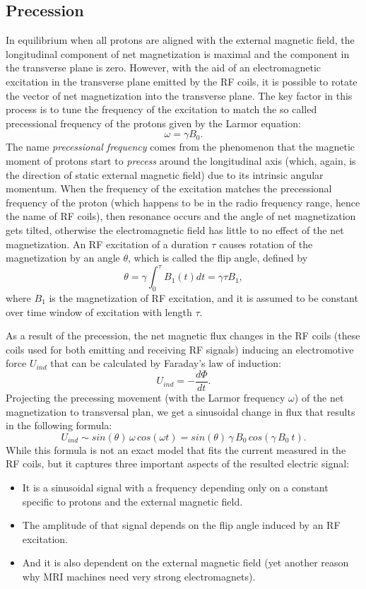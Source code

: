 \subsection{Precession}
In equilibrium when all protons are aligned with the external magnetic field, the longitudinal component of net magnetization is maximal and the component in the transverse plane is zero. However, with the aid of an electromagnetic excitation in the transverse plane emitted by the RF coils, it is possible to rotate the vector of net magnetization into the transverse plane. The key factor in this process is to tune the frequency of the excitation to match the so called precessional frequency of the protons given by the Larmor equation:
\[\omega = \gamma B_0.\]
The name \textit{precessional frequency} comes from the phenomenon that the magnetic moment of protons start to \textit{precess} around the longitudinal axis (which, again, is the direction of static external magnetic field) due to its intrinsic angular momentum. When the frequency of the excitation matches the precessional frequency of the proton (which happens to be in the radio frequency range, hence the name of RF coils), then resonance occurs and the angle of net magnetization gets tilted, otherwise the electromagnetic field has little to no effect of the net magnetization. An RF excitation of a duration $\tau$ causes rotation of the magnetization by an angle $\theta$, which is called the flip angle, defined by
\[\theta = \gamma \int_0^\tau B_1(t) dt = \gamma \tau B_1,\]
where $B_1$ is the magnetization of RF excitation, and it is assumed to be constant over time window of excitation with length $\tau$.

As a result of the precession, the net magnetic flux changes in the RF coils (these coils used for both emitting and receiving RF signals) inducing an electromotive force $U_{ind}$ that can be calculated by Faraday's law of induction:
\[U_{ind} = -\frac{d\Phi}{dt}.\]
Projecting the precessing movement (with the Larmor frequency $\omega$) of the net magnetization to transversal plan, we get a sinusoidal change in flux that results in the following formula:
\[U_{ind} \sim sin(\theta)\, \omega\, cos(\omega t) = sin(\theta)\, \gamma\, B_0\, cos(\gamma\, B_0\ t).\]
While this formula is not an exact model that fits the current measured in the RF coils, but it captures three important aspects of the resulted electric signal:
\begin{itemize}
    \item It is a sinusoidal signal with a frequency depending only on a constant specific to protons and the external magnetic field.
    \item The amplitude of that signal depends on the flip angle induced by an RF excitation.
    \item And it is also dependent on the external magnetic field (yet another reason why MRI machines need very strong electromagnets).
\end{itemize}


